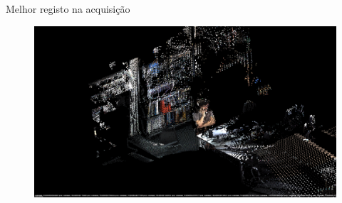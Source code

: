 \begin{frame}{Melhor registo na acquisição}
    
    \centering
    \begin{figure}
        \includegraphics[width=\textwidth]{img/radlocc_medium_regist.png}
    \end{figure}

\end{frame}